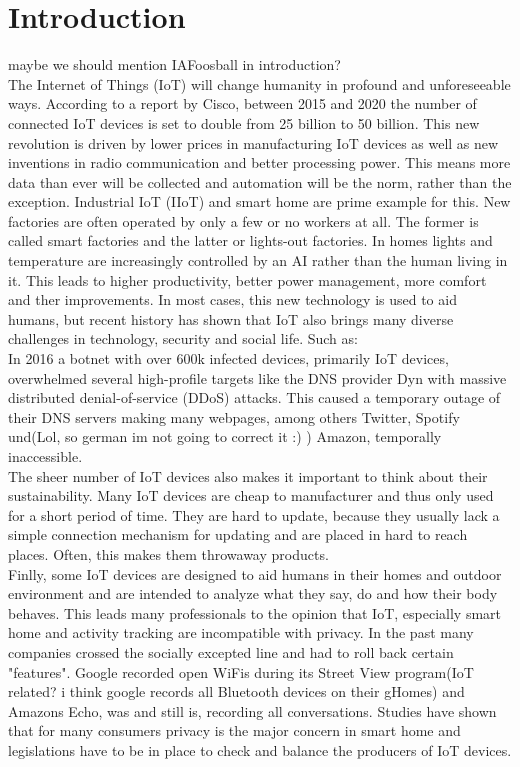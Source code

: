 \section{Introduction}
maybe we should mention IAFoosball in introduction?\\
The Internet of Things (IoT) will change humanity in profound and unforeseeable ways\cite{ciscoReport}. According to a report by Cisco, between 2015 and 2020 the number of connected IoT devices is set to double from 25 billion to 50 billion\cite{ciscoReport}. This new revolution is driven by lower prices in manufacturing IoT devices as well as new inventions in radio communication and better processing power. This means more data than ever will be collected and automation will be the norm, rather than the exception. Industrial IoT (IIoT) and smart home are prime example for this. New factories are often operated by only a few or no workers at all. The former is called smart factories and the latter or lights-out factories\cite{smartVSLightoutFactories:online}. In homes lights and temperature are increasingly controlled by an AI rather than the human living in it. This leads to higher productivity, better power management, more comfort and ther improvements. In most cases, this new technology is used to aid humans, but recent history has shown that IoT also brings many diverse challenges in technology, security and social life. Such as:\\

In 2016 a botnet with over 600k infected devices, primarily IoT devices, overwhelmed several high-profile targets like the DNS provider Dyn with massive distributed denial-of-service (DDoS) attacks. This caused a temporary outage of their DNS servers making many webpages, among others  Twitter, Spotify und(Lol, so german im not going to correct it :) ) Amazon, temporally inaccessible.\\

The sheer number of IoT devices also makes it important to think about their sustainability. Many IoT devices are cheap to manufacturer and thus only used for a short period of time. They are hard to update, because they usually lack a simple connection mechanism for updating and are placed in hard to reach places. Often, this makes them throwaway products.\\

Finlly, some IoT devices are designed to aid humans in their homes and outdoor environment and are intended to analyze what they say, do and how their body behaves. This leads many professionals to the opinion that IoT, especially smart home and activity tracking are incompatible with privacy\cite{5Reasons41:online}. In the past many companies crossed the socially excepted line and had to roll back certain "features"\cite{PrivacyIoT50:online}. Google recorded open WiFis during its Street View program(IoT related? i think google records all Bluetooth devices on their gHomes) and Amazons Echo, was and still is, recording all conversations. Studies have shown that for many consumers privacy is the major concern in smart home\cite{PrivacyIoT50:online} and legislations have to be in place to check and balance the producers of IoT devices.\\

